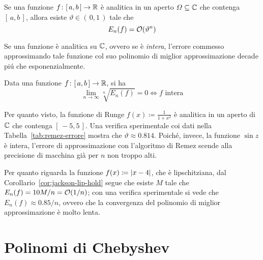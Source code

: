	\begin{teorema}\label{th:errore-approx-analitica}
		Se una funzione \(f \colon [\, a, b \,] \to \mathbb{R}\) è analitica in un aperto \(\varOmega \subseteq \mathbb{C}\) che contenga \([\, a, b \,]\), allora esiste \(\vartheta \in (\, 0, 1 \,)\) tale che
		\begin{equation}\label{eq:errore-approx-analitica}
			E_n (f) = \order{\vartheta^n}
		\end{equation}
	\end{teorema}

	Se una funzione è analitica su \(\mathbb{C}\), ovvero se è \emph{intera}, l'errore commesso approssimando tale funzione col suo polinomio di miglior approssimazione decade piú che esponenzialmente.
	
	\begin{teorema}[Bernstein]\label{th:bernstein}
		Data una funzione \(f \colon [\, a, b \,] \to \mathbb{R}\), si ha
		\begin{equation}\label{eq:bernstein}
			\lim_{n \to \infty} \sqrt[n]{E_n (f)} = 0 \iff \text{\(f\) intera}
		\end{equation}
	\end{teorema}

	\begin{osservazione}
		Per quanto visto, la funzione di Runge \(f (x) \coloneqq \frac{1}{1 + x^2}\) è analitica in un aperto di \(\mathbb{C}\) che contenga \([\, -5, 5 \,]\). Una verifica sperimentale coi dati nella Tabella~\ref{tab:remez-errore} mostra che \(\vartheta \approx \num{0.814}\). Poiché, invece, la funzione \(\sin z\) è intera, l'errore di approssimazione con l'algoritmo di Remez scende alla precisione di macchina già per \(n\) non troppo alti.
		
		Per quanto riguarda la funzione \(f (x) \coloneqq \abs{x - 4}\), che è lipschitziana, dal Corollario~\ref{cor:jackson-lip-hold} segue che esiste \(M\) tale che \(E_n (f) = 10 M / n = \order{1 / n}\); con una verifica sperimentale si vede che \(E_n (f) \approx \num{0.85} / n\), ovvero che la convergenza del polinomio di miglior approssimazione è molto lenta.
	\end{osservazione}

\section{Polinomi di Chebyshev}
	
